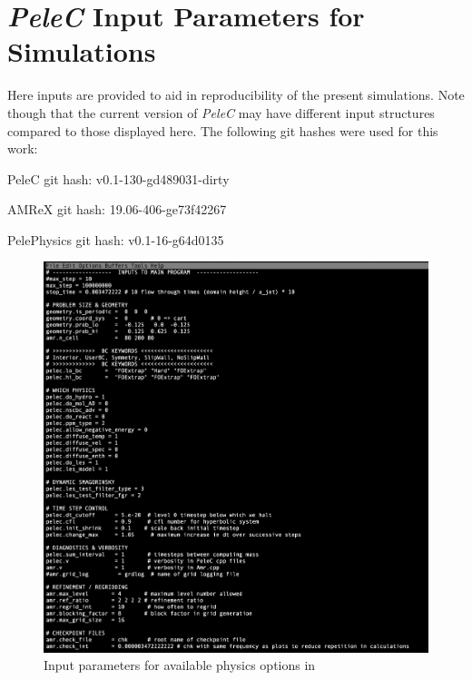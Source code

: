 \chapter{\textit{PeleC} Input Parameters for Simulations} \label{Pelec-Inputs}
Here inputs are provided to aid in reproducibility of the present simulations. Note though that the current version of \textit{PeleC} may have different input structures compared to those displayed here. The following git hashes were used for this work:

PeleC git hash: v0.1-130-gd489031-dirty

AMReX git hash: 19.06-406-ge73f42267

PelePhysics git hash: v0.1-16-g64d0135

\begin{figure}[H]
\begin{center}
\includegraphics[scale=0.5]{figures/inputs.png}
\end{center}
\caption{Input parameters for available physics options in }
\label{PeleC_input_fig}
\end{figure} 

